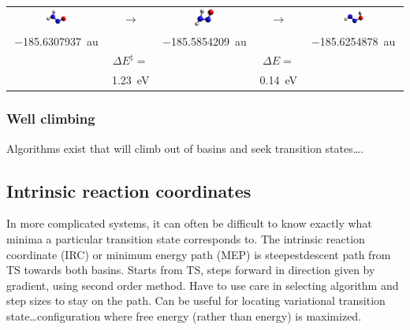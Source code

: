 \documentclass[11pt]{article}
\begin{document}
\begin{center}
\begin{tabular}{ccccc}
\includegraphics[width=0.22\textwidth]{./Images/H2NNO.png}
 & \(\longrightarrow\) & 
\includegraphics[width=0.22\textwidth]{./Images/H2NNO-TS.png} & \(\longrightarrow\) & \includegraphics[width=0.22\textwidth]{./Images/HNNOH.png} \\
\SI{-185.6307937}{au} &  & \SI{-185.5854209}{au} & & \SI{-185.6254878}{au}\\
  &  \(\Delta E^\ddagger =\) & & \(\Delta E =\) \\
  &  \SI{1.23}{eV} & &  \SI{0.14}{eV} \\
\end{tabular}
\end{center}

\subsubsection{Well climbing}
\label{sec:org8ad4d4e}
Algorithms exist that will climb out of basins and seek transition states\ldots{}.
\subsection{Intrinsic reaction coordinates}
\label{sec:org33055e2}
In more complicated systems, it can often be difficult to know exactly what minima a particular transition state corresponds to. The intrinsic reaction coordinate (IRC) or minimum energy path (MEP) is steepestdescent path from TS towards both basins. Starts from TS, steps forward in direction given by gradient, using second order method. Have to use care in selecting algorithm and step sizes to stay on the path. Can be useful for locating variational transition state\ldots{}configuration where free energy (rather than energy) is maximized. 
\end{document}
